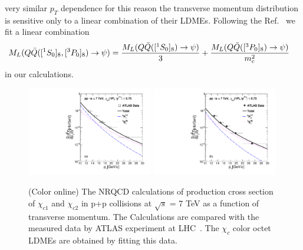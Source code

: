 \documentclass[aps,prc,preprint,superscriptaddress,showpacs,showkeys,amsmath]{revtex4-1}
\begin{document}
very similar $p_{T}$ dependence for this reason the transverse momentum distribution 
is sensitive only to a linear combination of their LDMEs.
Following the Ref.~\cite{Cho:1995vh,Beneke:1996yw} we fit a linear combination 
\begin{equation}
  \begin{split}
    M_{L}(Q{\bar{Q}}([^1S_0]_{8},[^3P_0]_{8})\rightarrow \psi)&= \frac{M_{L}(Q{\bar{Q}}([^1S_0]_{8})\rightarrow \psi)}{3} + \frac{M_{L}(Q{\bar{Q}}([^3P_0]_{8})\rightarrow \psi)}{m_{c}^{2}} \nonumber
  \end{split}
\end{equation}
in our calculations.
\begin{figure}
\includegraphics[width=0.49\textwidth]{Fig1a_Chic1_ATLAS_Fit.pdf}
\includegraphics[width=0.49\textwidth]{Fig1b_Chic2_ATLAS_Fit.pdf}
\caption{(Color online) The NRQCD calculations of production cross section 
of  $\chi_{c1}$ and $\chi_{c2}$ in p+p collisions at
$\sqrt{s}$ = 7 TeV as a function of transverse momentum. 
The Calculations are compared with the measured data by
ATLAS experiment at LHC~\cite{ATLAS:2014ala}. The $\chi_{c}$
color octet LDMEs are obtained by fitting this data. 
}
\label{Fig:LDMEChicATLAS}
\end{figure}
\end{document}
